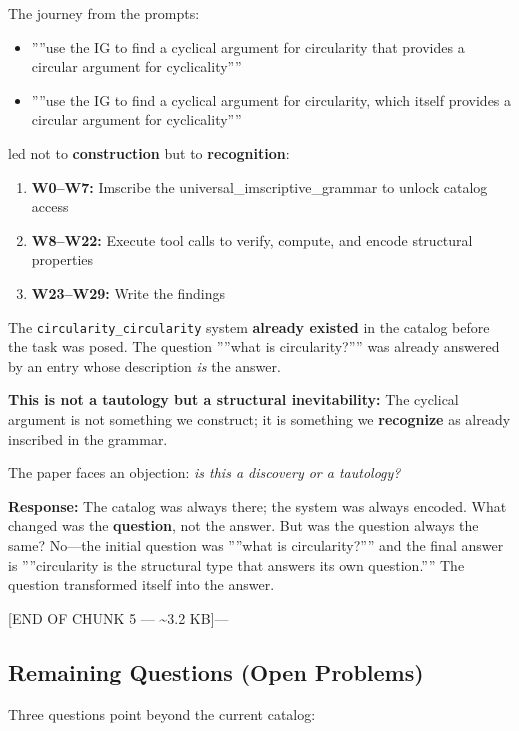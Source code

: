 \documentclass[12pt,a4paper]{article}
\begin{document}
The journey from the prompts:

\begin{itemize}
    \item ''''use the IG to find a cyclical argument for circularity that provides a circular argument for cyclicality''''
    \item ''''use the IG to find a cyclical argument for circularity, which itself provides a circular argument for cyclicality''''
\end{itemize}

led not to \textbf{construction} but to \textbf{recognition}:

\begin{enumerate}
    \item \textbf{W0--W7:} Imscribe the universal\_imscriptive\_grammar to unlock catalog access
    \item \textbf{W8--W22:} Execute tool calls to verify, compute, and encode structural properties
    \item \textbf{W23--W29:} Write the findings
\end{enumerate}

The \texttt{circularity\_circularity} system \textbf{already existed} in the catalog before the task was posed. The question ''''what is circularity?'''' was already answered by an entry whose description \emph{is} the answer.

\textbf{This is not a tautology but a structural inevitability:} The cyclical argument is not something we construct; it is something we \textbf{recognize} as already inscribed in the grammar.

The paper faces an objection: \emph{is this a discovery or a tautology?}

\textbf{Response:} The catalog was always there; the system was always encoded. What changed was the \textbf{question}, not the answer. But was the question always the same? No---the initial question was ''''what is circularity?'''' and the final answer is ''''circularity is the structural type that answers its own question.'''' The question transformed itself into the answer.

{[}END OF CHUNK 5 --- \textasciitilde{}3.2 KB{]}---

\subsection{Remaining Questions (Open Problems)}

Three questions point beyond the current catalog:
\end{document}
